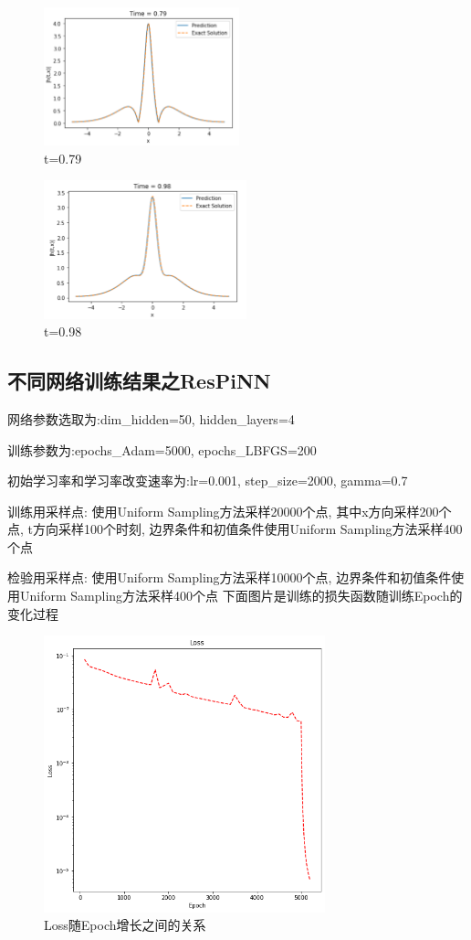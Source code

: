 \documentclass[addpoints,answers]{exam}
\begin{document}
    \begin{figure}
    	\centering
    	\includegraphics[height=4cm]{2.png}
    	\caption{t=0.79}
    \end{figure}
    
    \begin{figure}
    	\centering
    	\includegraphics[height=4cm]{3.png}
    	\caption{t=0.98}
    \end{figure}
    
    \clearpage


   \subsection{不同网络训练结果之ResPiNN}
    
    网络参数选取为:dim\_hidden=50, hidden\_layers=4
    
    训练参数为:epochs\_Adam=5000, epochs\_LBFGS=200
    
    初始学习率和学习率改变速率为:lr=0.001, step\_size=2000, gamma=0.7
    
    训练用采样点: 使用Uniform Sampling方法采样20000个点, 其中x方向采样200个点, t方向采样100个时刻, 边界条件和初值条件使用Uniform Sampling方法采样400个点
    
    检验用采样点: 使用Uniform Sampling方法采样10000个点, 边界条件和初值条件使用Uniform Sampling方法采样400个点
    下面图片是训练的损失函数随训练Epoch的变化过程
    \clearpage
    \vspace{0.5cm}
    \begin{figure}
    	\centering
    	\includegraphics[height=8cm]{5.png}
    	\caption{Loss随Epoch增长之间的关系}
    \end{figure}
    
\end{document}
